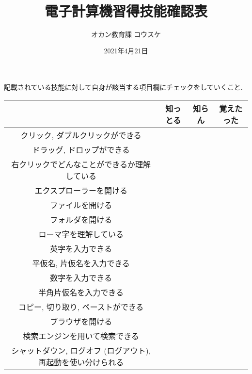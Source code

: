 \documentclass[lualatex]{jlreq}
\title{電子計算機習得技能確認表}
\author{オカン教育課 コウスケ}
\date{2021年4月21日}
\begin{document}
\maketitle

\thispagestyle{fancy} 
\cfoot{} %

\begin{center}
記載されている技能に対して自身が該当する項目欄にチェックをしていくこと.
\end{center}

\begin{table}[h]
\begin{tabular}{|c|c|c|c|}
\hline
 & 知っとる & 知らん & 覚えたった \\ \hline
クリック, ダブルクリックができる &  &  &  \\ \hline
ドラッグ, ドロップができる &  &  &  \\ \hline
右クリックでどんなことができるか理解している &  &  &  \\ \hline
エクスプローラーを開ける &  &  &  \\ \hline
ファイルを開ける &  &  &  \\ \hline
フォルダを開ける &  &  &  \\ \hline
ローマ字を理解している &  &  &  \\ \hline
英字を入力できる &  &  &  \\ \hline
平仮名, 片仮名を入力できる &  &  &  \\ \hline
数字を入力できる &  &  &  \\ \hline
半角片仮名を入力できる &  &  &  \\ \hline
コピー, 切り取り, ペーストができる &  &  &  \\ \hline
ブラウザを開ける &  &  &  \\ \hline
検索エンジンを用いて検索できる &  &  &  \\ \hline
シャットダウン, ログオフ (ログアウト), 再起動を使い分けられる &  &  &  \\ \hline
\end{tabular}
\end{table}
\end{document}
